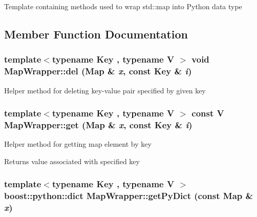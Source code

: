 Template containing methods used to wrap std::map into Python data type 

\subsection{Member Function Documentation}
\hypertarget{struct_stl_containers_wrappers_1_1_map_wrapper_a53d6b96019b6a897857456aeca41e307}{
\subsubsection[{del}]{\setlength{\rightskip}{0pt plus 5cm}template$<$typename Key , typename V $>$ void MapWrapper::del (Map \& {\em x}, \/  const Key \& {\em i})}}
\label{struct_stl_containers_wrappers_1_1_map_wrapper_a53d6b96019b6a897857456aeca41e307}
Helper method for deleting key-\/value pair specified by given key \hypertarget{struct_stl_containers_wrappers_1_1_map_wrapper_a07fb2d02f615e98dea6b89eed318cf50}{
\subsubsection[{get}]{\setlength{\rightskip}{0pt plus 5cm}template$<$typename Key , typename V $>$ const V MapWrapper::get (Map \& {\em x}, \/  const Key \& {\em i})}}
\label{struct_stl_containers_wrappers_1_1_map_wrapper_a07fb2d02f615e98dea6b89eed318cf50}
Helper method for getting map element by key \begin{DoxyReturn}{Returns}
value associated with specified key 
\end{DoxyReturn}
\hypertarget{struct_stl_containers_wrappers_1_1_map_wrapper_ad5e7ad1b461f1693a90fcca938199382}{
\subsubsection[{getPyDict}]{\setlength{\rightskip}{0pt plus 5cm}template$<$typename Key , typename V $>$ boost::python::dict MapWrapper::getPyDict (const Map \& {\em x})}}

